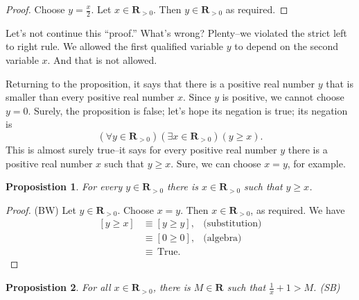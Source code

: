\documentclass[12pt,fleqn,answers]{exam}
\newcommand{\reals}{\mathbf{R}}
\newcommand{\true}{\, \mathrm{True}}
\newenvironment{myproof}
  {\begin{shaded}\begin{proof}}
  {\end{proof}\end{shaded}}
\newtheorem{prop}{Proposistion}
\begin{document}
       \begin{myproof} Choose $y=\frac{x}{2}$. Let $x \in \reals_{>0}$.
        Then $y \in \reals_{>0}$ as required.
             \end{myproof}
       \noindent Let's not continue this ``proof.''  What's wrong?  Plenty--we 
       violated the strict left to right rule. We allowed the 
       first qualified variable $y$ to depend on the second variable 
       $x$. And that is not allowed.

      Returning to the proposition, it says that there is a 
      positive real number $y$ that is smaller 
       than every positive  real number $x$. Since $y$ is positive, we 
        cannot choose $y = 0$. Surely, the proposition is false;
       let's hope its negation is true; its negation is
       \begin{equation*}
         \left(\forall y \in \reals_{>0}\right)\left(\exists x \in \reals_{>0}\right) \left(y \geq  x \right).
       \end{equation*}
       This is almost surely true--it says for every positive real number $y$ there is a 
       positive real number $x$ such that
       $y \geq x$.    Sure, we can choose $x = y$, for example.

       \begin{prop} For every $y \in \reals_{> 0}$ there is  
        $x \in \reals_{>0}$ such that $y \geq  x$.
      \end{prop}

       \begin{myproof} (BW) Let $y \in \reals_{>0}$. Choose $x = y$. Then $x \in \reals_{>0}$, as 
        required. We have
       \begin{align*}
         \left[y \geq x  \right] &\equiv \left[y \geq  y \right], & \mbox{(substitution)} \\
                                      &\equiv \left[0 \geq 0 \right], &\mbox{(algebra)} \\
                                      &\equiv \true.
       \end{align*}
       
       \end{myproof}

   


       
    \begin{prop} For all $x \in \reals_{>0}$, there is $M \in \reals$ such
     that $\frac{1}{x} +1 > M$. \hfill (SB)
    \end{prop}
\end{document}

